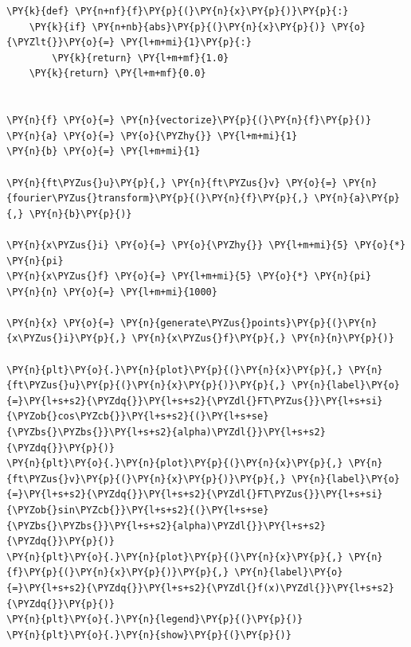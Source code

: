     \begin{tcolorbox}[breakable, size=fbox, boxrule=1pt, pad at break*=1mm,colback=cellbackground, colframe=cellborder]
\begin{Verbatim}[commandchars=\\\{\}]
\PY{k}{def} \PY{n+nf}{f}\PY{p}{(}\PY{n}{x}\PY{p}{)}\PY{p}{:}
    \PY{k}{if} \PY{n+nb}{abs}\PY{p}{(}\PY{n}{x}\PY{p}{)} \PY{o}{\PYZlt{}}\PY{o}{=} \PY{l+m+mi}{1}\PY{p}{:}
        \PY{k}{return} \PY{l+m+mf}{1.0}
    \PY{k}{return} \PY{l+m+mf}{0.0}


\PY{n}{f} \PY{o}{=} \PY{n}{vectorize}\PY{p}{(}\PY{n}{f}\PY{p}{)}
\PY{n}{a} \PY{o}{=} \PY{o}{\PYZhy{}} \PY{l+m+mi}{1}
\PY{n}{b} \PY{o}{=} \PY{l+m+mi}{1}

\PY{n}{ft\PYZus{}u}\PY{p}{,} \PY{n}{ft\PYZus{}v} \PY{o}{=} \PY{n}{fourier\PYZus{}transform}\PY{p}{(}\PY{n}{f}\PY{p}{,} \PY{n}{a}\PY{p}{,} \PY{n}{b}\PY{p}{)}

\PY{n}{x\PYZus{}i} \PY{o}{=} \PY{o}{\PYZhy{}} \PY{l+m+mi}{5} \PY{o}{*} \PY{n}{pi}
\PY{n}{x\PYZus{}f} \PY{o}{=} \PY{l+m+mi}{5} \PY{o}{*} \PY{n}{pi}
\PY{n}{n} \PY{o}{=} \PY{l+m+mi}{1000}

\PY{n}{x} \PY{o}{=} \PY{n}{generate\PYZus{}points}\PY{p}{(}\PY{n}{x\PYZus{}i}\PY{p}{,} \PY{n}{x\PYZus{}f}\PY{p}{,} \PY{n}{n}\PY{p}{)}

\PY{n}{plt}\PY{o}{.}\PY{n}{plot}\PY{p}{(}\PY{n}{x}\PY{p}{,} \PY{n}{ft\PYZus{}u}\PY{p}{(}\PY{n}{x}\PY{p}{)}\PY{p}{,} \PY{n}{label}\PY{o}{=}\PY{l+s+s2}{\PYZdq{}}\PY{l+s+s2}{\PYZdl{}FT\PYZus{}}\PY{l+s+si}{\PYZob{}cos\PYZcb{}}\PY{l+s+s2}{(}\PY{l+s+se}{\PYZbs{}\PYZbs{}}\PY{l+s+s2}{alpha)\PYZdl{}}\PY{l+s+s2}{\PYZdq{}}\PY{p}{)}
\PY{n}{plt}\PY{o}{.}\PY{n}{plot}\PY{p}{(}\PY{n}{x}\PY{p}{,} \PY{n}{ft\PYZus{}v}\PY{p}{(}\PY{n}{x}\PY{p}{)}\PY{p}{,} \PY{n}{label}\PY{o}{=}\PY{l+s+s2}{\PYZdq{}}\PY{l+s+s2}{\PYZdl{}FT\PYZus{}}\PY{l+s+si}{\PYZob{}sin\PYZcb{}}\PY{l+s+s2}{(}\PY{l+s+se}{\PYZbs{}\PYZbs{}}\PY{l+s+s2}{alpha)\PYZdl{}}\PY{l+s+s2}{\PYZdq{}}\PY{p}{)}
\PY{n}{plt}\PY{o}{.}\PY{n}{plot}\PY{p}{(}\PY{n}{x}\PY{p}{,} \PY{n}{f}\PY{p}{(}\PY{n}{x}\PY{p}{)}\PY{p}{,} \PY{n}{label}\PY{o}{=}\PY{l+s+s2}{\PYZdq{}}\PY{l+s+s2}{\PYZdl{}f(x)\PYZdl{}}\PY{l+s+s2}{\PYZdq{}}\PY{p}{)}
\PY{n}{plt}\PY{o}{.}\PY{n}{legend}\PY{p}{(}\PY{p}{)}
\PY{n}{plt}\PY{o}{.}\PY{n}{show}\PY{p}{(}\PY{p}{)}
\end{Verbatim}
\end{tcolorbox}

    \begin{center}
    \end{center}
    { \hspace*{\fill} \\}
    
